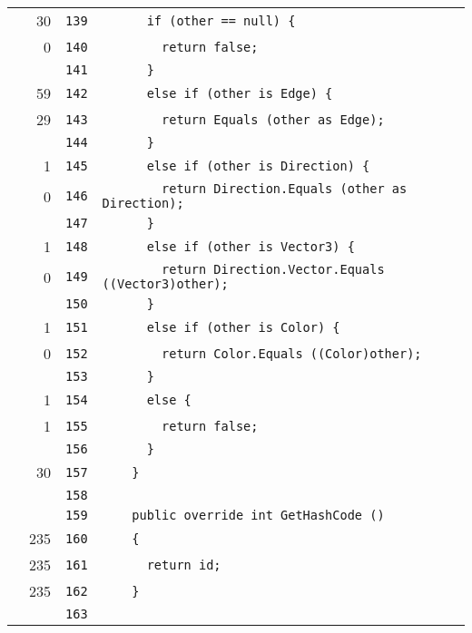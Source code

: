\documentclass[a4paper,10pt]{article}
\begin{document}
\begin{longtable}[l]{lrrl}
\cellcolor{green} & 30 & \verb~139~ & \verb~      if (other == null) {~\\
\cellcolor{red} & 0 & \verb~140~ & \verb~        return false;~\\
\cellcolor{gray} &  & \verb~141~ & \verb~      }~\\
\cellcolor{green} & 59 & \verb~142~ & \verb~      else if (other is Edge) {~\\
\cellcolor{green} & 29 & \verb~143~ & \verb~        return Equals (other as Edge);~\\
\cellcolor{gray} &  & \verb~144~ & \verb~      }~\\
\cellcolor{green} & 1 & \verb~145~ & \verb~      else if (other is Direction) {~\\
\cellcolor{red} & 0 & \verb~146~ & \verb~        return Direction.Equals (other as Direction);~\\
\cellcolor{gray} &  & \verb~147~ & \verb~      }~\\
\cellcolor{green} & 1 & \verb~148~ & \verb~      else if (other is Vector3) {~\\
\cellcolor{red} & 0 & \verb~149~ & \verb~        return Direction.Vector.Equals ((Vector3)other);~\\
\cellcolor{gray} &  & \verb~150~ & \verb~      }~\\
\cellcolor{green} & 1 & \verb~151~ & \verb~      else if (other is Color) {~\\
\cellcolor{red} & 0 & \verb~152~ & \verb~        return Color.Equals ((Color)other);~\\
\cellcolor{gray} &  & \verb~153~ & \verb~      }~\\
\cellcolor{green} & 1 & \verb~154~ & \verb~      else {~\\
\cellcolor{green} & 1 & \verb~155~ & \verb~        return false;~\\
\cellcolor{gray} &  & \verb~156~ & \verb~      }~\\
\cellcolor{green} & 30 & \verb~157~ & \verb~    }~\\
\cellcolor{gray} &  & \verb~158~ & \verb~~\\
\cellcolor{gray} &  & \verb~159~ & \verb~    public override int GetHashCode ()~\\
\cellcolor{green} & 235 & \verb~160~ & \verb~    {~\\
\cellcolor{green} & 235 & \verb~161~ & \verb~      return id;~\\
\cellcolor{green} & 235 & \verb~162~ & \verb~    }~\\
\cellcolor{gray} &  & \verb~163~ & \verb~~\\

\end{longtable}
\end{document}
